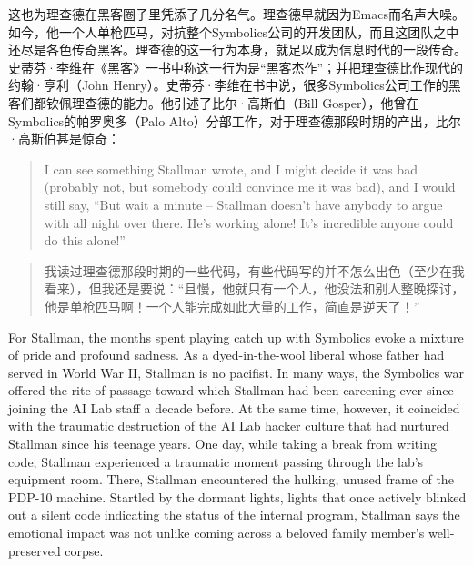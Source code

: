 \ifdefined\chs
这也为理查德在黑客圈子里凭添了几分名气。理查德早就因为Emacs而名声大噪。如今，他一个人单枪匹马，对抗整个Symbolics公司的开发团队，而且这团队之中还尽是各色传奇黑客。理查德的这一行为本身，就足以成为信息时代的一段传奇。史蒂芬·李维在《黑客》一书中称这一行为是“黑客杰作”；并把理查德比作现代的约翰·亨利（John Henry）。史蒂芬·李维在书中说，很多Symbolics公司工作的黑客们都钦佩理查德的能力。他引述了比尔·高斯伯（Bill Gosper），他曾在Symbolics的帕罗奥多（Palo Alto）分部工作，对于理查德那段时期的产出，比尔·高斯伯甚是惊奇：
\fi

\ifdefined\eng
\begin{quote}
I can see something Stallman wrote, and I might decide it was bad (probably not, but somebody could convince me it was bad), and I would still say, ``But wait a minute -- Stallman doesn't have anybody to argue with all night over there. He's working alone! It's incredible anyone could do this alone!''
\end{quote}
\fi

\ifdefined\chs
\begin{quote}
我读过理查德那段时期的一些代码，有些代码写的并不怎么出色（至少在我看来），但我还是要说：“且慢，他就只有一个人，他没法和别人整晚探讨，他是单枪匹马啊！一个人能完成如此大量的工作，简直是逆天了！”
\end{quote}
\fi

\ifdefined\eng
For Stallman, the months spent playing catch up with Symbolics evoke a mixture of pride and profound sadness. As a dyed-in-the-wool liberal whose father had served in World War II, Stallman is no pacifist. In many ways, the Symbolics war offered the rite of passage toward which Stallman had been careening ever since joining the AI Lab staff a decade before. At the same time, however, it coincided with the traumatic destruction of the AI Lab hacker culture that had nurtured Stallman since his teenage years. One day, while taking a break from writing code, Stallman experienced a traumatic moment passing through the lab's equipment room. There, Stallman encountered the hulking, unused frame of the PDP-10 machine. Startled by the dormant lights, lights that once actively blinked out a silent code indicating the status of the internal program, Stallman says the emotional impact was not unlike coming across a beloved family member's well-preserved corpse.
\fi

